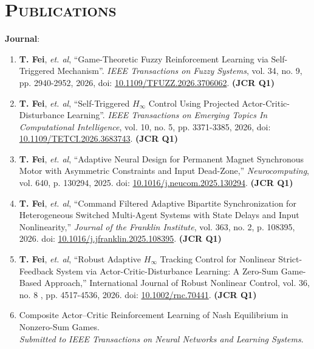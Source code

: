 \documentclass[a4paper,11pt]{article}
\begin{document}
\section{\textsc{\Large{Publications}}}
\begin{itemize}[leftmargin=0in, label={}]
  \small{\item{\textbf{Journal}:}}
  \begin{enumerate}[leftmargin=0.24in]
  	\item \small{\textbf{T. Fei}, \textit{et. al}, “Game-Theoretic Fuzzy Reinforcement Learning via Self-Triggered Mechanism”. \textit{IEEE Transactions on Fuzzy Systems}, vol. 34, no. 9, pp. 2940-2952, 2026, doi: \href{https://doi.org/10.1109/TFUZZ.2026.3706062}{10.1109/TFUZZ.2026.3706062}. \textbf{(JCR Q1)}}
  	
  	\item \small{\textbf{T. Fei}, \textit{et. al}, “Self-Triggered $H_\infty$ Control Using Projected Actor-Critic-Disturbance Learning”. \textit{IEEE Transactions on Emerging Topics In Computational Intelligence}, vol. 10, no. 5, pp. 3371-3385, 2026, doi: \href{https://doi.org/10.1109/TETCI.2026.3683743}{10.1109/TETCI.2026.3683743}. \textbf{(JCR Q1)}}
  	
  	\item \small{\textbf{T. Fei}, \textit{et. al}, “Adaptive Neural Design for Permanent Magnet Synchronous Motor with Asymmetric Constraints and Input Dead-Zone,” \textit{Neurocomputing}, vol. 640, p. 130294, 2025. doi: \href{https://doi.org/10.1016/j.neucom.2025.130294}{10.1016/j.neucom.2025.130294}. \textbf{(JCR Q1)}}
  	
  	\item \small{\textbf{T. Fei}, \textit{et. al}, “Command Filtered Adaptive Bipartite Synchronization for Heterogeneous Switched Multi-Agent Systems with State Delays and Input Nonlinearity,” \textit{Journal of the Franklin Institute}, vol. 363, no. 2, p. 108395, 2026. doi: \href{https://doi.org/10.1016/j.jfranklin.2025.108395}{10.1016/j.jfranklin.2025.108395}. \textbf{(JCR Q1)}}
  	
  	\item \small{\textbf{T. Fei}, \textit{et. al}, “Robust Adaptive $H_\infty$ Tracking Control for Nonlinear Strict-Feedback System via Actor-Critic-Disturbance Learning: A Zero-Sum Game-Based Approach,” International Journal of Robust Nonlinear Control, vol. 36, no. 8 , pp. 4517-4536, 2026. doi: \href{https://doi.org/10.1002/rnc.70441}{10.1002/rnc.70441}. \textbf{(JCR Q1)}}
  	 \item \small{Composite Actor–Critic Reinforcement Learning of Nash Equilibrium in Nonzero-Sum Games. \\ \textit{Submitted to} \textit{IEEE Transactions on Neural Networks and Learning Systems}.}
  \end{enumerate}
\end{itemize}
\end{document}
